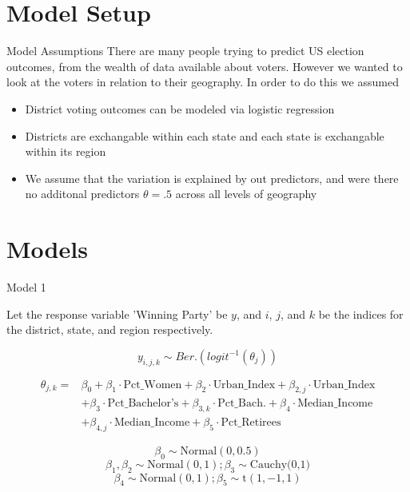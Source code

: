 \documentclass{beamer}
\begin{document}

\section{Model Setup}
\begin{frame}{Model Assumptions}
  There are many people trying to predict US election outcomes, from the wealth of data available about voters. However we wanted to look at the voters in relation to their geography. In order to do this we assumed 
  \begin{itemize}
    \item District voting outcomes can be modeled via logistic regression 
    \item Districts are exchangable within each state and each state is exchangable within its region
    \item We assume that the variation is explained by out predictors, and were there no additonal predictors $\theta = .5$ across all levels of geography 
  \end{itemize}
  \end{frame}





\section{Models}

\begin{frame}{Model 1}


    Let the response variable 'Winning Party' be \(y\), and \(i\), \(j\), and \(k\) be the indices for the district, state, and region respectively. 

    \[y_{i,j,k} \sim Ber.(logit^{-1}(\theta_{j}))\]
    
\[
\begin{aligned}
   \theta_{j,k} = &\beta_0 + \beta_1 \cdot \text{Pct\_Women} + \beta_2 \cdot \text{Urban\_Index} + \beta_{2,j} \cdot \text{Urban\_Index} \\
    &+ \beta_3 \cdot \text{Pct\_Bachelor's} + \beta_{3,k} \cdot \text{Pct\_Bach.} + \beta_{4} \cdot \text{Median\_Income} \\ 
    &+ \beta_{4,j} \cdot \text{Median\_Income} + \beta_{5} \cdot \text{Pct\_Retirees}
\end{aligned}
\]

    \[\beta_0 \sim \text{Normal}(0, 0.5)\]
    \[\beta_1, \beta_2 \sim \text{Normal}(0, 1); \beta_3 \sim \text{Cauchy(0,1)}\] 
    \[\beta_4 \sim \text{Normal}(0,1); \beta_5 \sim \text{t}(1,-1,1)\]
    
\end{frame}
\end{document}
